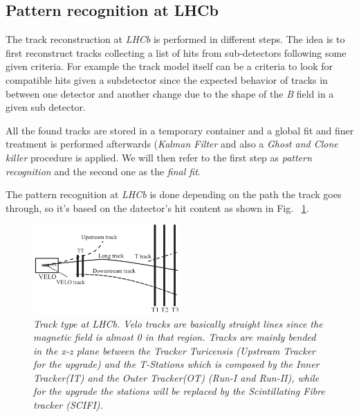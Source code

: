 \documentclass[paper=a4, fontsize=10pt]{scrartcl}
\numberwithin{equation}{section}		%
\numberwithin{figure}{section}			%
\numberwithin{table}{section}				%
\begin{document}
\subsection{Pattern recognition at LHCb}


The track reconstruction at \textit{LHCb} is performed in different steps. The idea is to first reconstruct tracks collecting a list of hits from sub-detectors following some given criteria. For example the track model itself can be a criteria to look for compatible hits given a subdetector since the expected behavior of tracks in between one detector and another change due to the shape of the \textit{B} field in a given sub detector.

All the found tracks are stored in a temporary container and a global fit and finer treatment is performed afterwards (\textit{Kalman Filter} and also a \textit{Ghost and Clone killer} procedure is applied. We will then refer to the first step as \textit{pattern recognition} and the second one as the \textit{final fit}. 

The pattern recognition at \textit{LHCb} is done depending on the path the track goes through, so it's based on the datector's hit content as shown in Fig. ~\ref{figure:Tracks}.
\begin{figure}[h]
  \begin{center}
    \includegraphics[width=0.5\textwidth]{Images/tracktype.png} 
  \caption[Caption for track type]{\emph{Track type at \textit{LHCb}. Velo tracks are basically straight lines since the magnetic field is almost 0 in that region. Tracks are mainly bended in the x-z \footnotemark plane between the Tracker Turicensis (Upstream Tracker for the upgrade) and the T-Stations which is composed by the Inner Tracker(IT) and the Outer Tracker(OT) (Run-I and Run-II), while for the upgrade the stations will be replaced by the Scintillating Fibre tracker (SCIFI).}}
  \label{figure:Tracks}
  \end{center}
\end{figure}
\end{document}
